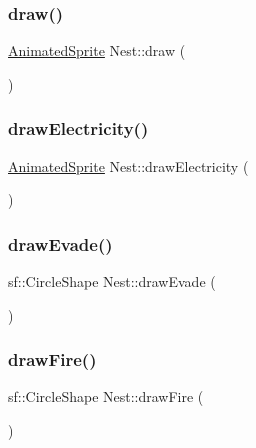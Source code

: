 \mbox{\label{class_nest_a6e4950498b1c767c513e1a5fac4259e5}} 
\subsubsection{\texorpdfstring{draw()}{draw()}}
{\footnotesize\ttfamily \hyperlink{class_animated_sprite}{Animated\+Sprite} Nest\+::draw (\begin{DoxyParamCaption}{ }\end{DoxyParamCaption})}

\mbox{\label{class_nest_ad90f39c39a435c3cb2702880b624d254}} 
\subsubsection{\texorpdfstring{draw\+Electricity()}{drawElectricity()}}
{\footnotesize\ttfamily \hyperlink{class_animated_sprite}{Animated\+Sprite} Nest\+::draw\+Electricity (\begin{DoxyParamCaption}{ }\end{DoxyParamCaption})}

\mbox{\label{class_nest_a69a224e6296dadbeee744697d308259c}} 
\subsubsection{\texorpdfstring{draw\+Evade()}{drawEvade()}}
{\footnotesize\ttfamily sf\+::\+Circle\+Shape Nest\+::draw\+Evade (\begin{DoxyParamCaption}{ }\end{DoxyParamCaption})}

\mbox{\label{class_nest_a3118b2257f6864632abf907c42af94fd}} 
\subsubsection{\texorpdfstring{draw\+Fire()}{drawFire()}}
{\footnotesize\ttfamily sf\+::\+Circle\+Shape Nest\+::draw\+Fire (\begin{DoxyParamCaption}{ }\end{DoxyParamCaption})}

